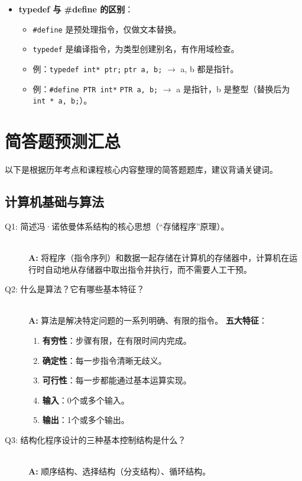 \documentclass[a4paper,12pt]{article}
\begin{document}
\begin{itemize}
    \item \textbf{typedef 与 \#define 的区别}：
    \begin{itemize}
        \item \texttt{\#define} 是预处理指令，仅做文本替换。
        \item \texttt{typedef} 是编译指令，为类型创建别名，有作用域检查。
        \item 例：\texttt{typedef int* ptr;} \texttt{ptr a, b;} $\rightarrow$ a, b 都是指针。
        \item 例：\texttt{\#define PTR int*} \texttt{PTR a, b;} $\rightarrow$ a 是指针，b 是整型（替换后为 \texttt{int * a, b;}）。
    \end{itemize}
\end{itemize}

\section{简答题预测汇总}

以下是根据历年考点和课程核心内容整理的简答题题库，建议背诵关键词。

\subsection{计算机基础与算法}
\begin{description}
    \item[Q1: 简述冯·诺依曼体系结构的核心思想（“存储程序”原理）。] \hfill \\
    \textbf{A:} 将程序（指令序列）和数据一起存储在计算机的存储器中，计算机在运行时自动地从存储器中取出指令并执行，而不需要人工干预。
    
    \item[Q2: 什么是算法？它有哪些基本特征？] \hfill \\
    \textbf{A:} 算法是解决特定问题的一系列明确、有限的指令。
    \textbf{五大特征}：
    \begin{enumerate}
        \item \textbf{有穷性}：步骤有限，在有限时间内完成。
        \item \textbf{确定性}：每一步指令清晰无歧义。
        \item \textbf{可行性}：每一步都能通过基本运算实现。
        \item \textbf{输入}：0个或多个输入。
        \item \textbf{输出}：1个或多个输出。
    \end{enumerate}

    \item[Q3: 结构化程序设计的三种基本控制结构是什么？] \hfill \\
    \textbf{A:} 顺序结构、选择结构（分支结构）、循环结构。
\end{description}
\end{document}
